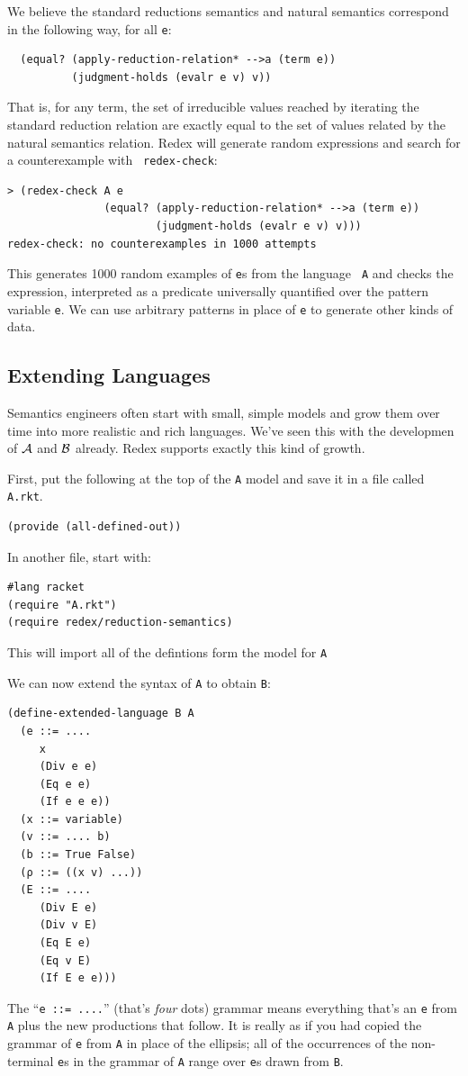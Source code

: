 We believe the standard reductions semantics and natural semantics
correspond in the following way, for all {\tt e}:
\begin{verbatim}
  (equal? (apply-reduction-relation* -->a (term e))
          (judgment-holds (evalr e v) v))
\end{verbatim}
That is, for any term, the set of irreducible values reached by
iterating the standard reduction relation are exactly equal to the set
of values related by the natural semantics relation.  Redex will
generate random expressions and search for a counterexample with {\tt
  redex-check}:
\begin{verbatim}                                                                          
> (redex-check A e
               (equal? (apply-reduction-relation* -->a (term e))
                       (judgment-holds (evalr e v) v)))
redex-check: no counterexamples in 1000 attempts
\end{verbatim}
This generates 1000 random examples of {\tt e}s from the language {\tt
  A} and checks the expression, interpreted as a predicate universally
quantified over the pattern variable {\tt e}.  We can use arbitrary
patterns in place of {\tt e} to generate other kinds of data.

\subsection{Extending Languages}

Semantics engineers often start with small, simple models and grow
them over time into more realistic and rich languages.  We've seen
this with the developmen of $\mathcal{A}$ and $\mathcal{B}$ already.  Redex
supports exactly this kind of growth.

First, put the following at the top of the {\tt A} model and save it
in a file called {\tt A.rkt}.
\begin{verbatim}
(provide (all-defined-out))
\end{verbatim}

In another file, start with:
\begin{verbatim}
#lang racket
(require "A.rkt")
(require redex/reduction-semantics)
\end{verbatim}
This will import all of the defintions form the model for {\tt A}

We can now extend the syntax of {\tt A} to obtain {\tt B}:
\begin{verbatim}
(define-extended-language B A
  (e ::= ....
     x
     (Div e e)
     (Eq e e)
     (If e e e))
  (x ::= variable)
  (v ::= .... b)
  (b ::= True False) 
  (ρ ::= ((x v) ...))
  (E ::= ....
     (Div E e)
     (Div v E)
     (Eq E e)
     (Eq v E)
     (If E e e)))
\end{verbatim}
The ``{\tt e ::= ....}'' (that's \emph{four} dots) grammar means
everything that's an {\tt e} from {\tt A} plus the new productions
that follow.  It is really as if you had copied the grammar of {\tt e}
from {\tt A} in place of the ellipsis; all of the occurrences of the
non-terminal {\tt e}s in the grammar of {\tt A} range over {\tt e}s
drawn from {\tt B}.

